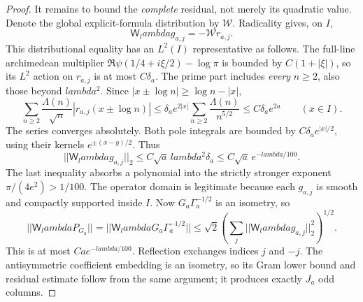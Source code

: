 \documentclass[11pt]{article}
\def\lambda{lambda}%
\def\norm#1{||#1||}%
\theoremstyle{remark}
\newcommand{\norm}[1]{\left\lVert #1\right\rVert}
\begin{document}
\begin{proof}
It remains to bound the \emph{complete} residual, not merely its
quadratic value.  Denote the global explicit-formula distribution by
$\mathcal W$.  Radicality gives, on $I$,
\[
 \mathsf W_\lambda g_{a,j}=-\mathcal W r_{a,j}.
\]
This distributional equality has an $L^2(I)$ representative as follows.
The full-line archimedean multiplier
$\Re\psi(1/4+i\xi/2)-\log\pi$ is bounded by $C(1+|\xi|)$,
so its $L^2$ action on $r_{a,j}$ is at most $C\delta_a$.
The prime part includes \emph{every} $n\ge2$, also those beyond
$\lambda^2$.  Since $|x\pm\log n|\ge\log n-|x|$,
\[
 \sum_{n\ge2}\frac{\Lambda(n)}{\sqrt n}
   |r_{a,j}(x\pm\log n)|
 \le\delta_a e^{2|x|}
             \sum_{n\ge2}\frac{\Lambda(n)}{n^{5/2}}
 \le C\delta_a e^{2a}\qquad(x\in I).
\]
The series converges absolutely.  Both pole integrals are bounded
by $C\delta_a e^{|x|/2}$, using their kernels $e^{\pm(x-y)/2}$.
Thus
\[
 \norm{\mathsf W_\lambda g_{a,j}}_2
 \le C\sqrt a\,\lambda^2\delta_a
 \le C\sqrt a\,e^{-\lambda/100}.
\]
The last inequality absorbs a polynomial into the strictly stronger
exponent $\pi/(4e^2)>1/100$.  The operator domain is legitimate
because each $g_{a,j}$ is smooth and compactly supported inside $I$.
Now $G_a\Gamma_a^{-1/2}$ is an isometry, so
\[
 \norm{\mathsf W_\lambda P_{G_a}}
 =\norm{\mathsf W_\lambda G_a\Gamma_a^{-1/2}}
 \le\sqrt2\left(\sum_j
             \norm{\mathsf W_\lambda g_{a,j}}_2^2\right)^{1/2}.
\]
This is at most $Ca e^{-\lambda/100}$.  Reflection exchanges
indices $j$ and $-j$.  The antisymmetric coefficient embedding is
an isometry, so its Gram lower bound and residual estimate follow
from the same argument; it produces exactly $J_a$ odd columns.
\end{proof}
\end{document}
